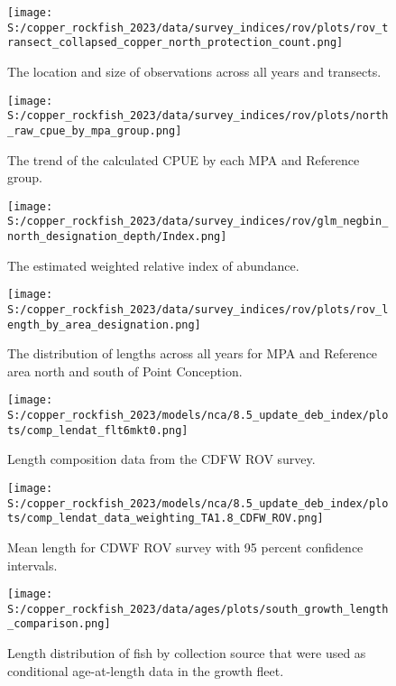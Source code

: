 \documentclass[11pt,
  english,
  letterpaper,
]{article}
\begin{document}
\begin{figure}
\centering
\texttt{[image: S:/copper\_rockfish\_2023/data/survey\_indices/rov/plots/rov\_transect\_collapsed\_copper\_north\_protection\_count.png]}
\caption{The location and size of observations across all years and transects.\label{fig:rov-obs-loc}}
\end{figure}

\begin{figure}
\centering
\texttt{[image: S:/copper\_rockfish\_2023/data/survey\_indices/rov/plots/north\_raw\_cpue\_by\_mpa\_group.png]}
\caption{The trend of the calculated CPUE by each MPA and Reference group.\label{fig:rov-raw-cpue}}
\end{figure}

\begin{figure}
\centering
\texttt{[image: S:/copper\_rockfish\_2023/data/survey\_indices/rov/glm\_negbin\_north\_designation\_depth/Index.png]}
\caption{The estimated weighted relative index of abundance.\label{fig:rov-index-main}}
\end{figure}

\begin{figure}
\centering
\texttt{[image: S:/copper\_rockfish\_2023/data/survey\_indices/rov/plots/rov\_length\_by\_area\_designation.png]}
\caption{The distribution of lengths across all years for MPA and Reference area north and south of Point Conception.\label{fig:rov-len}}
\end{figure}

\begin{figure}
\centering
\texttt{[image: S:/copper\_rockfish\_2023/models/nca/8.5\_update\_deb\_index/plots/comp\_lendat\_flt6mkt0.png]}
\caption{Length composition data from the CDFW ROV survey.\label{fig:rov-len-data}}
\end{figure}

\begin{figure}
\centering
\texttt{[image: S:/copper\_rockfish\_2023/models/nca/8.5\_update\_deb\_index/plots/comp\_lendat\_data\_weighting\_TA1.8\_CDFW\_ROV.png]}
\caption{Mean length for CDWF ROV survey with 95 percent confidence intervals.\label{fig:mean-rov-len-data}}
\end{figure}

\begin{figure}
\centering
\texttt{[image: S:/copper\_rockfish\_2023/data/ages/plots/south\_growth\_length\_comparison.png]}
\caption{Length distribution of fish by collection source that were used as conditional age-at-length data in the growth fleet.\label{fig:growth-len-dist}}
\end{figure}
\end{document}
